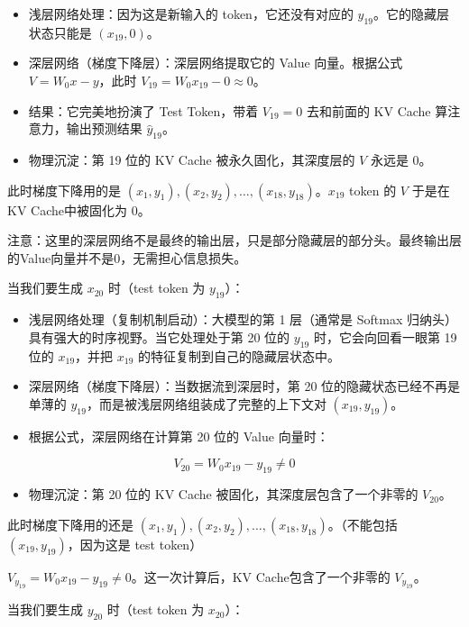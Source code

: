 \begin{itemize}
\tightlist
\item
  浅层网络处理：因为这是新输入的 token，它还没有对应的 \(y_{19}\)。它的隐藏层状态只能是 \((x_{19},0)\)。
\item
  深层网络（梯度下降层）：深层网络提取它的 Value 向量。根据公式 \(V = W_0x - y\)，此时 \(V_{19}=W_0x_{19}-0 \approx 0\)。
\item
  结果：它完美地扮演了 Test Token，带着 \(V_{19}=0\) 去和前面的 KV Cache 算注意力，输出预测结果 \(\hat{y}_{19}\)。
\item
  物理沉淀：第 19 位的 KV Cache 被永久固化，其深度层的 \(V\) 永远是 0。
\end{itemize}

此时梯度下降用的是 \((x_1,y_1),(x_2,y_2),\ldots,(x_{18},y_{18})\)。\(x_{19}\) token 的 \(V\) 于是在KV Cache中被固化为 \(0\)。

注意：这里的深层网络不是最终的输出层，只是部分隐藏层的部分头。最终输出层的Value向量并不是0，无需担心信息损失。

当我们要生成 \(x_{20}\) 时（test token 为 \(y_{19}\)）：

\begin{itemize}
\tightlist
\item
  浅层网络处理（复制机制启动）：大模型的第 1 层（通常是 Softmax 归纳头）具有强大的时序视野。当它处理处于第 20 位的 \(y_{19}\) 时，它会向回看一眼第 19 位的 \(x_{19}\)，并把 \(x_{19}\) 的特征复制到自己的隐藏层状态中。
\item
  深层网络（梯度下降层）：当数据流到深层时，第 20 位的隐藏状态已经不再是单薄的 \(y_{19}\)，而是被浅层网络组装成了完整的上下文对 \((x_{19},y_{19})\)。
\item
  根据公式，深层网络在计算第 20 位的 Value 向量时：
\end{itemize}

\[
V_{20} = W_0x_{19} - y_{19} \ne 0
\]

\begin{itemize}
\tightlist
\item
  物理沉淀：第 20 位的 KV Cache 被固化，其深度层包含了一个非零的 \(V_{20}\)。
\end{itemize}

此时梯度下降用的还是 \((x_1,y_1),(x_2,y_2),\ldots,(x_{18},y_{18})\)。（不能包括 \((x_{19},y_{19})\)，因为这是 test token）

\(V_{y_{19}}=W_0x_{19}-y_{19}\ne 0\)。这一次计算后，KV Cache包含了一个非零的 \(V_{y_{19}}\)。

当我们要生成 \(y_{20}\) 时（test token 为 \(x_{20}\)）：

